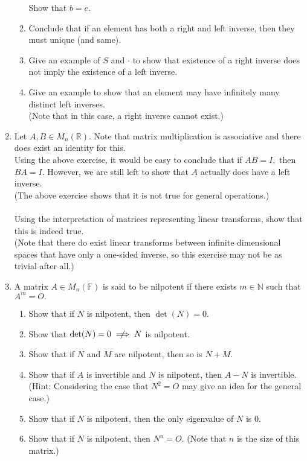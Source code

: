 \documentclass[12pt]{article}
\begin{document}
\begin{enumerate}
\begin{enumerate}[nosep]
		Show that $b = c.$
		\item Conclude that if an element has both a right and left inverse, then they must unique (and same).
		\item Give an example of $S$ and $\cdot$ to show that existence of a right inverse does not imply the existence of a left inverse.
		\item Give an example to show that an element may have infinitely many distinct left inverses.\\
		(Note that in this case, a right inverse cannot exist.)
	\end{enumerate}
	\item Let $A, B \in M_n(\mathbb{R}).$ Note that matrix multiplication is associative and there does exist an identity for this. \\
	Using the above exercise, it would be easy to conclude that if $AB = I,$ then $BA = I.$ However, we are still left to show that $A$ actually does have a left inverse.\\
	(The above exercise shows that it is not true for general operations.)\\~\\
	Using the interpretation of matrices representing linear transforms, show that this is indeed true.\\
	(Note that there do exist linear transforms between infinite dimensional spaces that have only a one-sided inverse, so this exercise may not be as trivial after all.)
	\item A matrix $A \in M_n(\mathbb{F})$ is said to be nilpotent if there exists $m \in \mathbb{N}$ such that $A^m = O.$
	\begin{enumerate} 
		\item Show that if $N$ is nilpotent, then $\det(N) = 0.$
		\item Show that $\det(N) = 0 \centernot\implies N$ is nilpotent.
		\item Show that if $N$ and $M$ are nilpotent, then so is $N+M.$
		\item Show that if $A$ is invertible and $N$ is nilpotent, then $A - N$ is invertible.\\
		(Hint: Considering the case that $N^2 = O$ may give an idea for the general case.)
		\item Show that if $N$ is nilpotent, then the only eigenvalue of $N$ is $0.$
		\item Show that if $N$ is nilpotent, then $N^n = O.$ (Note that $n$ is the size of this matrix.)
	\end{enumerate}

\end{enumerate}
\end{document}
